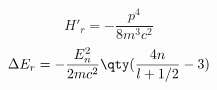 \begin{issues}
\issueTODO
\end{issues}

\begin{equation}
H'_r = -\frac{p^4}{8m^3 c^2}
\end{equation}
\begin{equation}
\Delta E_r = -\frac{E_n^2}{2mc^2} \qty(\frac{4n}{l+1/2}-3)
\end{equation}



